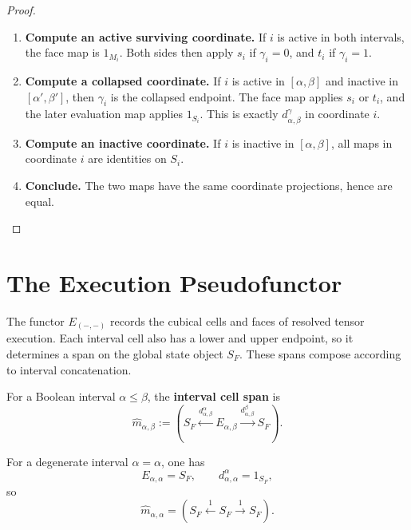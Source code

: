 \begin{proof}
    \leavevmode
    \begin{enumerate}
        \item \textbf{Compute an active surviving coordinate.}
        If \(i\) is active in both intervals, the face map is \(1_{M_i}\).
        Both sides then apply \(s_i\) if \(\gamma_i=0\), and \(t_i\) if
        \(\gamma_i=1\).

        \item \textbf{Compute a collapsed coordinate.}
        If \(i\) is active in \([\alpha,\beta]\) and inactive in
        \([\alpha',\beta']\), then \(\gamma_i\) is the collapsed endpoint.
        The face map applies \(s_i\) or \(t_i\), and the later evaluation map
        applies \(1_{S_i}\). This is exactly \(d_{\alpha,\beta}^\gamma\) in
        coordinate \(i\).

        \item \textbf{Compute an inactive coordinate.}
        If \(i\) is inactive in \([\alpha,\beta]\), all maps in coordinate
        \(i\) are identities on \(S_i\).

        \item \textbf{Conclude.}
        The two maps have the same coordinate projections, hence are equal.
    \end{enumerate}
\end{proof}

\section{The Execution Pseudofunctor}
\label{sec:cmett-execution-pseudofunctor}

The functor \(E_{(-,-)}\) records the cubical cells and faces of resolved
tensor execution. Each interval cell also has a lower and upper endpoint, so
it determines a span on the global state object \(S_F\). These spans compose
according to interval concatenation.

\begin{definition}
\label{def:cmett-interval-cell-span}
    For a Boolean interval \(\alpha\leq\beta\), the \textbf{interval cell
    span} is
    \[
        \widehat m_{\alpha,\beta}
        :=
        \left(
            S_F
            \xleftarrow{d_{\alpha,\beta}^{\alpha}}
            E_{\alpha,\beta}
            \xrightarrow{d_{\alpha,\beta}^{\beta}}
            S_F
        \right).
    \]
\end{definition}

For a degenerate interval \(\alpha=\alpha\), one has
\[
    E_{\alpha,\alpha}=S_F,
    \qquad
    d_{\alpha,\alpha}^{\alpha}=1_{S_F},
\]
so
\[
    \widehat m_{\alpha,\alpha}
    =
    \left(
        S_F\xleftarrow{1}S_F\xrightarrow{1}S_F
    \right).
\]

